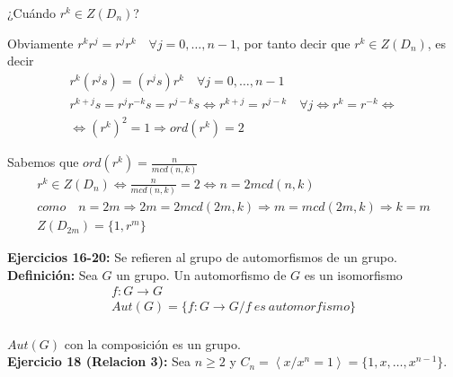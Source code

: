 \documentclass{article}
\begin{document}
¿Cuándo $r^k\in Z(D_n)$?

Obviamente $r^kr^j=r^jr^k \quad \forall j=0,\ldots,n-1$, por tanto decir que $r^k\in Z(D_n)$, es decir 
\begin{gather*}
r^k(r^js)=(r^js)r^k \quad \forall j=0,\ldots,n-1\\
r^{k+j}s=r^jr^{-k}s=r^{j-k}s\Leftrightarrow r^{k+j}=r^{j-k}\quad \forall j\Leftrightarrow r^k=r^{-k}\Leftrightarrow \\
\Leftrightarrow (r^k)^2=1\Rightarrow ord(r^k)=2
\end{gather*}

Sabemos que $ord(r^k)=\frac{n}{mcd(n,k)}$
\begin{gather*}
r^k\in Z(D_n)\Leftrightarrow \frac{n}{mcd(n,k)}=2\Leftrightarrow n=2mcd(n,k) \\
como\quad n=2m\Rightarrow 2m=2mcd(2m,k)\Rightarrow m=mcd(2m,k)\Rightarrow k=m \\
Z(D_{2m})=\{1,r^m\}
\end{gather*}

\textbf{Ejercicios 16-20:} Se refieren al grupo de automorfismos de un grupo.\\

\textbf{Definición:} Sea $G$ un grupo. Un automorfismo de $G$ es un isomorfismo
\begin{gather*}
f:G\longrightarrow G \\
Aut(G)=\{f:G\longrightarrow G/f\:es\:automorfismo\} \\
\end{gather*}

$Aut(G)$ con la composición es un grupo. \\

\textbf{Ejercicio 18 (Relacion 3):} Sea $n\geq 2$ y $C_n=\left\langle x /x^n=1\right\rangle =\{1,x,\ldots,x^{n-1}\}$.
\end{document}
